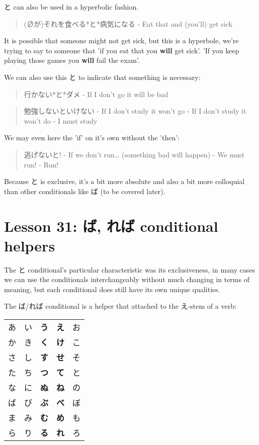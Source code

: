 \documentclass[11pt]{article}
\begin{document}
と can also be used in a hyperbolic fashion.
\begin{quote}
(∅が)それを食べる*と*病気になる - Eat that and (you'll) get sick
\end{quote}
It is possible that someone might not get sick, but this is a hyperbole, we're trying to say to someone that 'if you eat that you \textbf{will} get sick'. 'If you keep playing those games you \textbf{will} fail the exam'.

We can also use this と to indicate that something is necessary:
\begin{quote}
行かない*と*ダメ - If I don't go it will be bad
\end{quote}
\begin{quote}
勉強しないといけない - If I don't study it won't go - If I don't study it won't do - I must study
\end{quote}

We may even here the 'if' on it's own without the 'then':
\begin{quote}
逃げないと! - If we don't run\ldots{} (something bad will happen) - We must run! - Run!
\end{quote}

Because と is exclusive, it's a bit more absolute and also a bit more colloquial than other conditionals like ば (to be covered later).

\section{Lesson 31: ば, れば conditional helpers}
\label{sec:orga0f4e3b}
The と conditional's particular characteristic was its exclusiveness, in many cases we can use the conditionals interchangeably without much changing in terms of meaning, but each conditional does still have its own unique qualities.

The ば/れば conditional is a helper that attached to the え-stem of a verb:
\begin{center}
\begin{tabular}{lllll}
あ & い & \textbf{う} & \textbf{え} & お\\
か & き & \textbf{く} & \textbf{け} & こ\\
さ & し & \textbf{す} & \textbf{せ} & そ\\
た & ち & \textbf{つ} & \textbf{て} & と\\
な & に & \textbf{ぬ} & \textbf{ね} & の\\
ば & び & \textbf{ぶ} & \textbf{べ} & ぼ\\
ま & み & \textbf{む} & \textbf{め} & も\\
ら & り & \textbf{る} & \textbf{れ} & ろ\\
\end{tabular}
\end{center}
\end{document}
